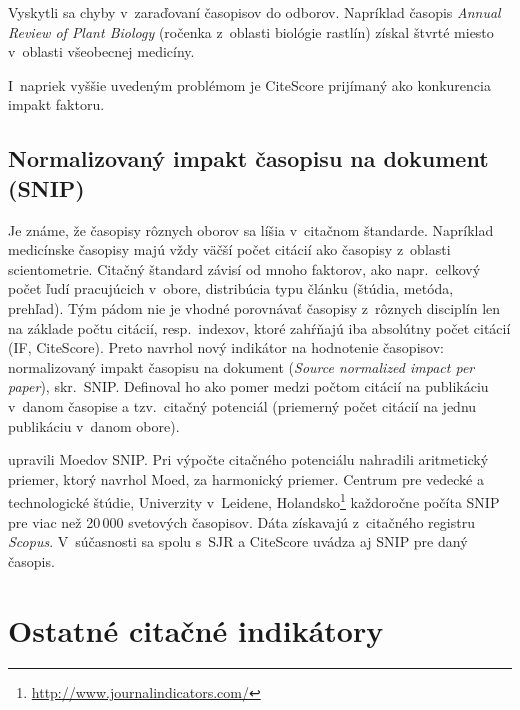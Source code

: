 Vyskytli sa chyby v~zaraďovaní časopisov do odborov.  Napríklad časopis
\emph{Annual Review of Plant Biology} (ročenka z~oblasti biológie rastlín)
získal štvrté miesto v~oblasti všeobecnej medicíny.

I~napriek vyššie uvedeným problémom je CiteScore prijímaný ako konkurencia
impakt faktoru.

\subsection{Normalizovaný impakt časopisu na dokument (SNIP)}
\label{sec:snip}

Je známe, že časopisy rôznych oborov sa líšia v~citačnom štandarde.  Napríklad
medicínske časopisy majú vždy väčší počet citácií ako časopisy z~oblasti
scientometrie.  Citačný štandard závisí od mnoho faktorov, ako napr.~celkový
počet ľudí pracujúcich v~obore, distribúcia typu článku (štúdia, metóda,
prehľad).  Tým pádom nie je vhodné porovnávať časopisy z~rôznych disciplín len
na základe počtu citácií, resp.~indexov, ktoré zahŕňajú iba absolútny počet
citácií (IF, CiteScore).  Preto \citet{Moed2010} navrhol nový indikátor na
hodnotenie časopisov: normalizovaný impakt časopisu na dokument (\emph{Source
  normalized impact per paper}), skr.~SNIP.  Definoval ho ako pomer medzi
počtom citácií na publikáciu v~danom časopise a tzv.~citačný potenciál
(priemerný počet citácií na jednu publikáciu v~danom obore).

\citet{Waltman2013} upravili Moedov SNIP.  Pri výpočte citačného potenciálu
nahradili aritmetický priemer, ktorý navrhol Moed, za harmonický priemer.
Centrum pre vedecké a technologické štúdie, Univerzity v~Leidene,
Holandsko\footnote{\url{http://www.journalindicators.com/}} každoročne počíta
SNIP pre viac než 20\,000 svetových časopisov.  Dáta získavajú z~citačného
registru \emph{Scopus}.  V~súčasnosti sa spolu s~SJR a CiteScore uvádza aj SNIP
pre daný časopis.

\section{Ostatné citačné indikátory}


